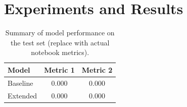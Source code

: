 \section{Experiments and Results}
\label{sec:experiments}


\begin{table}[H]
  \centering
  \caption{Summary of model performance on the test set (replace with actual notebook metrics).}
  \label{tab:model_comparison}
  \begin{tabular}{lcc}
    \toprule
    \textbf{Model} & \textbf{Metric 1} & \textbf{Metric 2} \\
    \midrule
    Baseline       & 0.000             & 0.000             \\
    Extended       & 0.000             & 0.000             \\
    \bottomrule
  \end{tabular}
\end{table}
